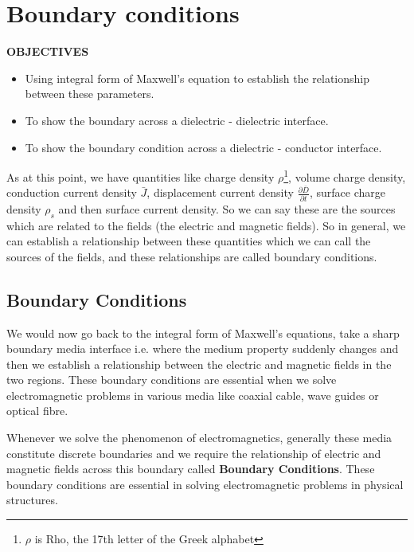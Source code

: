 \chapter{Boundary conditions}\label{lec:lec20}
 \textbf{OBJECTIVES}
 \begin{itemize}
 	\item Using integral form of Maxwell's equation to establish the relationship between these parameters.
 	\item To show the boundary across a dielectric - dielectric interface.
 	\item To show the boundary condition across a dielectric - conductor interface.
 \end{itemize}

As at this point, we have quantities like charge density $\rho$\footnote[1]{$\rho$ is Rho, the 17th letter of the Greek alphabet}, volume charge density, conduction current density $\bar{J}$, displacement current density $\frac{\partial \bar{D}}{\partial t}$, surface charge density $\rho_s$ and then surface current density. So we can say these are the sources which are related to the fields (the electric and magnetic fields). So in general, we can establish a relationship between these quantities which we can call the sources of the fields, and these relationships are called boundary conditions.

\section{Boundary Conditions}

We would now go back to the integral form of Maxwell's equations, take a sharp boundary media interface i.e. where the medium property suddenly changes and then we establish a relationship between the electric and magnetic fields in the two regions. These boundary conditions are essential when we solve electromagnetic problems in various media like coaxial cable, wave guides or optical fibre.

Whenever we solve the phenomenon of electromagnetics, generally these media constitute discrete boundaries and we require the relationship of electric and magnetic fields across this boundary called \textbf{Boundary Conditions}. These boundary conditions are essential in solving electromagnetic problems in physical structures.

